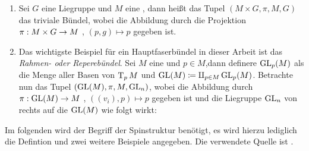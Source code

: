 \begin{Bsp}
	\begin{enumerate}[1)]
		\item Sei $G$ eine Liegruppe und $M$ eine \mfg, dann heißt das Tupel $(M \times G, \pi, M, G)$ das triviale Bündel, wobei die Abbildung
		durch die Projektion $\pi : M \times G \rightarrow M$ , $(p,g) \mapsto p$ 
		gegeben ist.
		\item Das wichtigste Beispiel für ein Hauptfaserbündel in dieser
		Arbeit ist das \textit{Rahmen- oder Reperebündel}. Sei $M$ eine \mfg und $p \in M$,dann definere $\operatorname{GL}_p(M)$ als die Menge aller Basen von
		$\operatorname{T}_{p}{M}$ und $\operatorname{GL}(M) \coloneqq \amalg_{p \in M} \operatorname{GL}_p(M)$. 
		Betrachte nun das Tupel $(\operatorname{GL}(M),\pi,M,\operatorname{GL}_n)$, wobei die Abbildung
		durch $\pi : \operatorname{GL}(M) \rightarrow M$ , $((v_i),p) \mapsto p$ gegeben ist
		und die Liegruppe $\operatorname{GL}_n$ von rechts auf die \mfg $\operatorname{GL}(M)$ wie  folgt
		wirkt:
		\begin{center}
		\end{center}
		
		
	\end{enumerate}
\end{Bsp}


Im folgenden wird der Begriff der Spinstruktur benötigt, es wird
hierzu lediglich die Defintion und zwei weitere Beispiele angegeben.
Die verwendete Quelle ist \cite{BHMMM15}.

